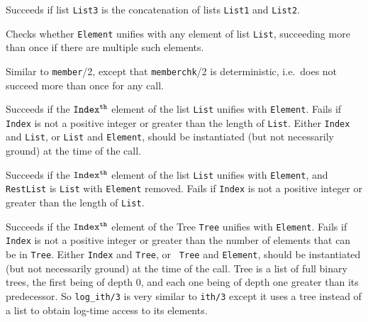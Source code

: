 \begin{description}
    Succeeds if list {\tt List3} is the concatenation of lists 
    {\tt List1} and {\tt List2}.

    Checks whether {\tt Element} unifies with any element of list 
    {\tt List}, succeeding more than once if there are multiple 
    such elements.

    Similar to {\tt member}/2, except that {\tt memberchk}/2 is
    deterministic, i.e.\ does not succeed more than once for any call.

    Succeeds if the ${\tt Index^{th}}$ element of the list {\tt List} 
    unifies with {\tt Element}.  Fails if {\tt Index} is not a positive
    integer or greater than the length of {\tt List}.
    Either {\tt Index} and {\tt List}, or {\tt List} and {\tt Element}, 
    should be instantiated (but not necessarily ground) at the time of 
    the call.

    Succeeds if the ${\tt Index^{th}}$ element of the list {\tt List}
    unifies with {\tt Element}, and {\tt RestList} is {\tt List} with
    {\tt Element} removed.  Fails if {\tt Index} is not a positive
    integer or greater than the length of {\tt List}.

    Succeeds if the ${\tt Index^{th}}$ element of the Tree {\tt Tree}
    unifies with {\tt Element}.  Fails if {\tt Index} is not a
    positive integer or greater than the number of elements that can
    be in {\tt Tree}.  Either {\tt Index} and {\tt Tree}, or {\tt
    Tree} and {\tt Element}, should be instantiated (but not
    necessarily ground) at the time of the call.  Tree is a list of
    full binary trees, the first being of depth 0, and each one being
    of depth one greater than its predecessor.  So {\tt log\_ith/3} is
    very similar to {\tt ith/3} except it uses a tree instead of a
    list to obtain log-time access to its elements.


\end{description}
